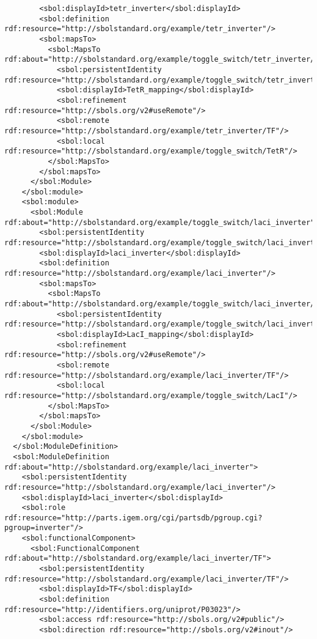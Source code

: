 \begin{lstlisting}
        <sbol:displayId>tetr_inverter</sbol:displayId>
        <sbol:definition rdf:resource="http://sbolstandard.org/example/tetr_inverter"/>
        <sbol:mapsTo>
          <sbol:MapsTo rdf:about="http://sbolstandard.org/example/toggle_switch/tetr_inverter/TetR_mapping">
            <sbol:persistentIdentity rdf:resource="http://sbolstandard.org/example/toggle_switch/tetr_inverter/TetR_mapping"/>
            <sbol:displayId>TetR_mapping</sbol:displayId>
            <sbol:refinement rdf:resource="http://sbols.org/v2#useRemote"/>
            <sbol:remote rdf:resource="http://sbolstandard.org/example/tetr_inverter/TF"/>
            <sbol:local rdf:resource="http://sbolstandard.org/example/toggle_switch/TetR"/>
          </sbol:MapsTo>
        </sbol:mapsTo>
      </sbol:Module>
    </sbol:module>
    <sbol:module>
      <sbol:Module rdf:about="http://sbolstandard.org/example/toggle_switch/laci_inverter">
        <sbol:persistentIdentity rdf:resource="http://sbolstandard.org/example/toggle_switch/laci_inverter"/>
        <sbol:displayId>laci_inverter</sbol:displayId>
        <sbol:definition rdf:resource="http://sbolstandard.org/example/laci_inverter"/>
        <sbol:mapsTo>
          <sbol:MapsTo rdf:about="http://sbolstandard.org/example/toggle_switch/laci_inverter/LacI_mapping">
            <sbol:persistentIdentity rdf:resource="http://sbolstandard.org/example/toggle_switch/laci_inverter/LacI_mapping"/>
            <sbol:displayId>LacI_mapping</sbol:displayId>
            <sbol:refinement rdf:resource="http://sbols.org/v2#useRemote"/>
            <sbol:remote rdf:resource="http://sbolstandard.org/example/laci_inverter/TF"/>
            <sbol:local rdf:resource="http://sbolstandard.org/example/toggle_switch/LacI"/>
          </sbol:MapsTo>
        </sbol:mapsTo>
      </sbol:Module>
    </sbol:module>
  </sbol:ModuleDefinition>
  <sbol:ModuleDefinition rdf:about="http://sbolstandard.org/example/laci_inverter">
    <sbol:persistentIdentity rdf:resource="http://sbolstandard.org/example/laci_inverter"/>
    <sbol:displayId>laci_inverter</sbol:displayId>
    <sbol:role rdf:resource="http://parts.igem.org/cgi/partsdb/pgroup.cgi?pgroup=inverter"/>
    <sbol:functionalComponent>
      <sbol:FunctionalComponent rdf:about="http://sbolstandard.org/example/laci_inverter/TF">
        <sbol:persistentIdentity rdf:resource="http://sbolstandard.org/example/laci_inverter/TF"/>
        <sbol:displayId>TF</sbol:displayId>
        <sbol:definition rdf:resource="http://identifiers.org/uniprot/P03023"/>
        <sbol:access rdf:resource="http://sbols.org/v2#public"/>
        <sbol:direction rdf:resource="http://sbols.org/v2#inout"/>

\end{lstlisting}
